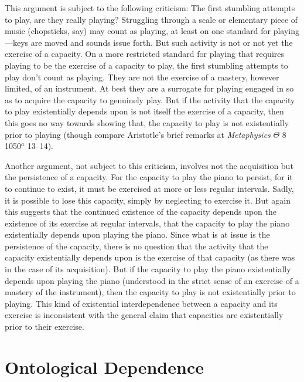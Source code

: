 \documentclass[12pt]{article}
\begin{document}
This argument is subject to the following criticism: The first stumbling attempts to play, are they really playing? Struggling through a scale or elementary piece of music (chopsticks, say) may count as playing, at least on one standard for playing---keys are moved and sounds issue forth. But such activity is not or not yet the exercise of a capacity. On a more restricted standard for playing that requires playing to be the exercise of a capacity to play, the first stumbling attempts to play don't count as playing. They are not the exercise of a mastery, however limited, of an instrument. At best they are a surrogate for playing engaged in so as to acquire the capacity to genuinely play. But if the activity that the capacity to play existentially depends upon is not itself the exercise of a capacity, then this goes no way towards showing that, the capacity to play is not existentially prior to playing (though compare Aristotle's brief remarks at \emph{Metaphysics} \( \Theta \) 8 1050\( ^{a} \) 13--14).

Another argument, not subject to this criticism, involves not the acquisition but the persistence of a capacity. For the capacity to play the piano to persist, for it to continue to exist, it must be exercised at more or less regular intervals. Sadly, it is possible to lose this capacity, simply by neglecting to exercise it. But again this suggests that the continued existence of the capacity depends upon the existence of its exercise at regular intervals, that the capacity to play the piano existentially depends upon playing the piano. Since what is at issue is the persistence of the capacity, there is no question that the activity that the capacity existentially depends upon is the exercise of that capacity (as there was in the case of its acquisition). But if the capacity to play the piano existentially depends upon playing the piano (understood in the strict sense of an exercise of a mastery of the instrument), then the capacity to play is not existentially prior to playing. This kind of existential interdependence between a capacity and its exercise is inconsistent with the general claim that capacities are existentially prior to their exercise.


\section{Ontological Dependence} %
\label{sec:capacities_and_their_exercise_ontological_dependence}
\end{document}
